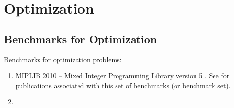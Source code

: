 









\chapter{Optimization}
\label{chp:Optimization}


\section{Benchmarks for Optimization}
\label{sec:BenchmarksForOptimization}

Benchmarks for optimization problems: \vspace{-0.3cm}
\begin{enumerate} \itemsep -4pt
\item MIPLIB 2010 -- Mixed Integer Programming Library version 5 \cite{Koch2011a}. See \cite{Achterberg2015a} for publications associated with this set of benchmarks (or benchmark set).
\item 
\end{enumerate}






